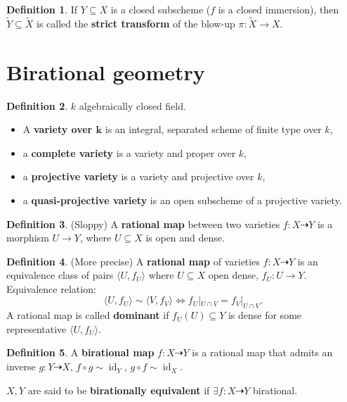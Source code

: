 \documentclass[12pt]{article}
\DeclareMathOperator{\id}{id}
\theoremstyle{definition}
\newtheorem*{definition}{Definition}
\theoremstyle{remark}
\begin{document}
\begin{definition}
If $Y\subseteq X$ is a closed subscheme ($f$ is a closed immersion), then $\widetilde{Y}\subseteq\widetilde{X}$ is called the \textbf{strict transform} of the blow-up $\pi:\widetilde{X}\rightarrow X$.
\end{definition}

\section{Birational geometry}
\begin{definition}
$k$ algebraically closed field.
\begin{itemize}
\item A \textbf{variety over $\boldsymbol{k}$} is an integral, separated scheme of finite type over $k$,
\item a \textbf{complete variety} is a variety and proper over $k$,
\item a \textbf{projective variety} is a variety and projective over $k$,
\item a \textbf{quasi-projective variety} is an open subscheme of a projective variety.
\end{itemize}
\end{definition}

\begin{definition}
(Sloppy) A \textbf{rational map} between two varieties $f:X\dashrightarrow Y$ is a morphism $U\rightarrow Y$, where $U\subseteq X$ is open and dense.
\end{definition}

\begin{definition}
(More precise) A \textbf{rational map} of varieties $f:X\dashrightarrow Y$ is an equivalence class of pairs $\langle U,f_U\rangle$ where $U\subseteq X$ open dense, $f_U:U\rightarrow Y$. Equivalence relation:
\[\langle U,f_U\rangle\sim\langle V,f_V\rangle\Longleftrightarrow f_U|_{U\cap V}=f_V|_{U\cap V}.\]
A rational map is called \textbf{dominant} if $f_U(U)\subseteq Y$ is dense for some representative $\langle U,f_U\rangle$.
\end{definition}

\begin{definition}
A \textbf{birational map} $f:X\dashrightarrow Y$ is a rational map that admits an inverse $g:Y\dashrightarrow X$, $f\circ g\sim\id_Y$, $g\circ f\sim\id_X$.

$X,Y$ are said to be \textbf{birationally equivalent} if $\exists f:X\dashrightarrow Y$ birational.
\end{definition}
\end{document}
